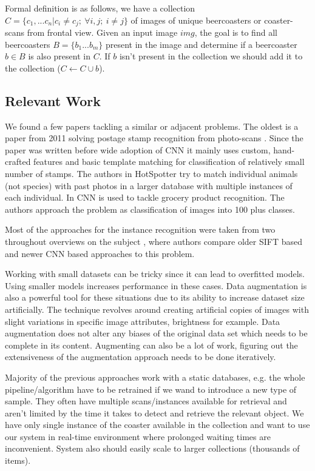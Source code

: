 \documentclass{article}
\begin{document}
Formal definition is as follows, we have a collection $C=\{c_1,...c_n | c_i \neq c_j;\ \forall i,j;\ i \neq j\}$ of images of unique beercoasters or coaster-scans from frontal view.
Given an input image $img$, the goal is to find all beercoasters $B=\{b_1...b_m\}$ present in the image 
and determine if a beercoaster $b \in B$ is also present in $C$. 
If $b$ isn't present in the collection we should add it to the collection ($C \leftarrow C \cup b$).

\subsection{Relevant Work}
We found a few papers tackling a similar or adjacent problems.
The oldest is a paper from 2011 solving postage stamp recognition from photo-scans \cite{}.
Since the paper was written before wide adoption of CNN it mainly uses custom, hand-crafted features and basic template matching for classification of relatively small number of stamps.
The authors in HotSpotter \cite{} try to match individual animals (not species) with past photos in a larger database with multiple instances of each individual.
In \cite{} CNN is used to tackle grocery product recognition. The authors approach the problem as classification of images into 100 plus classes.

Most of the approaches for the instance recognition were taken from two throughout overviews on the subject \cite{} \cite{},
where authors compare older SIFT based and newer CNN based approaches to this problem.

Working with small datasets can be tricky since it can lead to overfitted models. Using smaller models increases performance in these cases.\cite{} Data augmentation is also a powerful tool for these situations due to its ability to 
increase dataset size artificially. The technique revolves around creating artificial copies of images with slight variations in specific image attributes, brightness for example. Data augmentation does not alter any biases of the original data set which needs to be complete in its content. Augmenting can also be a lot of work, figuring out the extensiveness of the augmentation approach needs to be done iteratively. \cite{}


Majority of the previous approaches work with a static databases, e.g. the whole pipeline/algorithm have to be retrained if we wand to introduce a new type of sample.
They often have multiple scans/instances available for retrieval and aren't limited by the time it takes to detect and retrieve the relevant object.
We have only single instance of the coaster available in the collection and want to use our system in real-time environment where prolonged waiting times are inconvenient.
System also should easily scale to larger collections (thousands of items).
\end{document}

